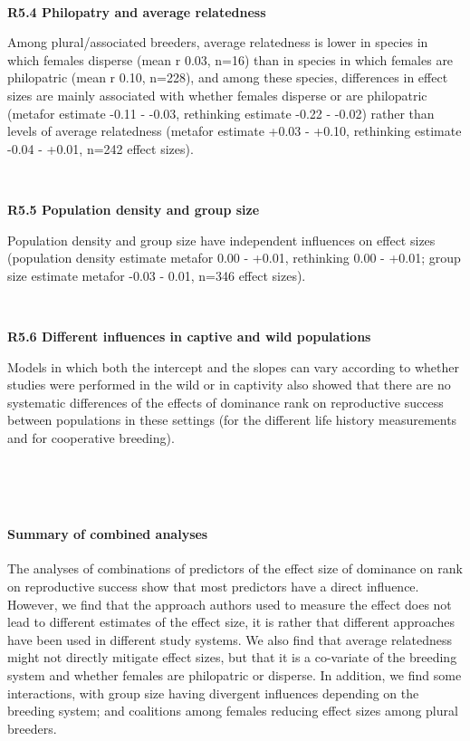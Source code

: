 \documentclass[
]{article}
\begin{document}
~

\textbf{R5.4 Philopatry and average relatedness}

Among plural/associated breeders, average relatedness is lower in
species in which females disperse (mean r 0.03, n=16) than in species in
which females are philopatric (mean r 0.10, n=228), and among these
species, differences in effect sizes are mainly associated with whether
females disperse or are philopatric (metafor estimate -0.11 - -0.03,
rethinking estimate -0.22 - -0.02) rather than levels of average
relatedness (metafor estimate +0.03 - +0.10, rethinking estimate -0.04 -
+0.01, n=242 effect sizes).

~

\textbf{R5.5 Population density and group size}

Population density and group size have independent influences on effect
sizes (population density estimate metafor 0.00 - +0.01, rethinking 0.00
- +0.01; group size estimate metafor -0.03 - 0.01, n=346 effect sizes).

~

\textbf{R5.6 Different influences in captive and wild populations}

Models in which both the intercept and the slopes can vary according to
whether studies were performed in the wild or in captivity also showed
that there are no systematic differences of the effects of dominance
rank on reproductive success between populations in these settings (for
the different life history measurements and for cooperative breeding).

~

~

\hypertarget{summary-of-combined-analyses}{%
\paragraph{\texorpdfstring{\textbf{Summary of combined
analyses}}{Summary of combined analyses}}\label{summary-of-combined-analyses}}

\hfill\break
The analyses of combinations of predictors of the effect size of
dominance on rank on reproductive success show that most predictors have
a direct influence. However, we find that the approach authors used to
measure the effect does not lead to different estimates of the effect
size, it is rather that different approaches have been used in different
study systems. We also find that average relatedness might not directly
mitigate effect sizes, but that it is a co-variate of the breeding
system and whether females are philopatric or disperse. In addition, we
find some interactions, with group size having divergent influences
depending on the breeding system; and coalitions among females reducing
effect sizes among plural breeders.
\end{document}
